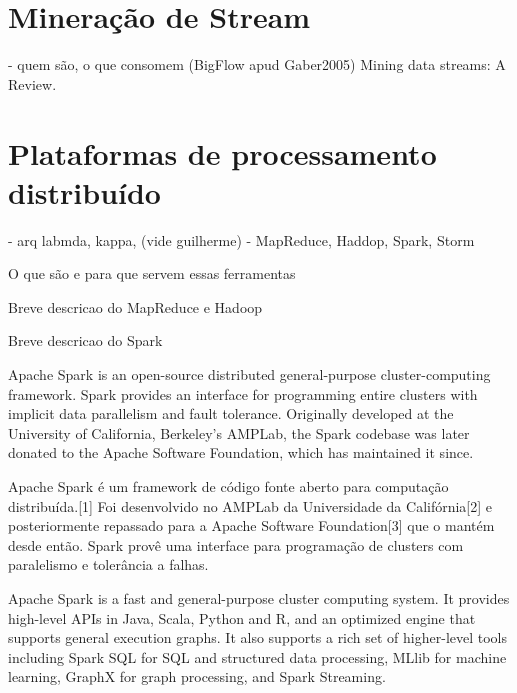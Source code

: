\section{Mineração de Stream}

- quem são, o que consomem
(BigFlow apud Gaber2005) Mining data streams: A Review.

\section{Plataformas de processamento distribuído}
- arq labmda, kappa, (vide guilherme)
- MapReduce, Haddop, Spark, Storm


O que são e para que servem essas ferramentas 

Breve descricao do MapReduce e Hadoop

Breve descricao do Spark 





Apache Spark is an open-source distributed general-purpose cluster-computing
framework. Spark provides an interface for programming entire clusters with
implicit data parallelism and fault tolerance. Originally developed at the
University of California, Berkeley's AMPLab, the Spark codebase was later
donated to the Apache Software Foundation, which has maintained it since.

Apache Spark é um framework de código fonte aberto para computação
distribuída.[1] Foi desenvolvido no AMPLab da Universidade da Califórnia[2] e
posteriormente repassado para a Apache Software Foundation[3] que o mantém desde
então. Spark provê uma interface para programação de clusters com paralelismo e
tolerância a falhas.

Apache Spark is a fast and general-purpose cluster computing system. It provides
high-level APIs in Java, Scala, Python and R, and an optimized engine that
supports general execution graphs. It also supports a rich set of higher-level
tools including Spark SQL for SQL and structured data processing, MLlib for
machine learning, GraphX for graph processing, and Spark Streaming.

